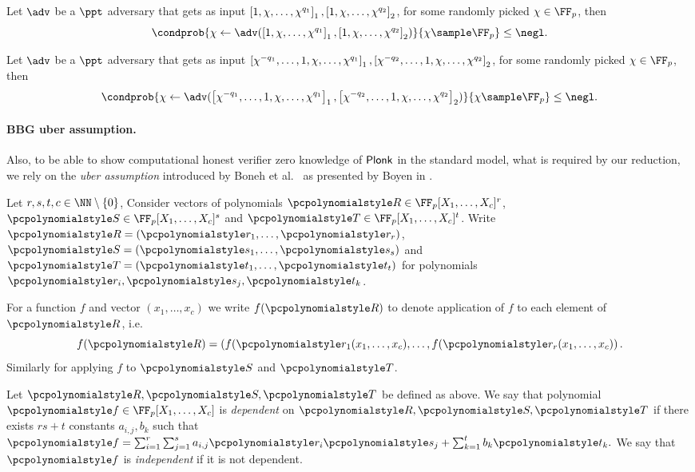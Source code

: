 \documentclass[runningheads,10pt]{llncs}
\begin{document}
\begin{definition}
	Let $\adv$ be a $\ppt$ adversary that gets as input
  $\left[1, \chi, \ldots, \chi^{q_1}\right]_{1}, \left[1, \chi, \ldots, \chi^{q_2}\right]_{2}$, for
  some randomly picked $\chi \in \FF_p$, then
	\[
		\condprob{\chi \gets \adv(\gone{1, \chi, \ldots, \chi^{q_1}}, \gtwo{1, \chi,
        \ldots, \chi^{q_2} })}{\chi \sample \FF_p} \leq \negl.
	\]
\end{definition}

\begin{definition}
  Let $\adv$ be a $\ppt$ adversary that gets as input
  $\left[\chi^{-q_1}, \ldots, 1, \chi, \ldots, \chi^{q_1}\right]_{1}, \left[\chi^{-q_2},
    \ldots, 1, \chi, \ldots, \chi^{q_2}\right]_{2}$, for some randomly picked
  $\chi \in \FF_p$, then
	\[
    \condprob{\chi \gets \adv(\gone{\chi^{-q_1}, \ldots, 1, \chi, \ldots,
        \chi^{q_1}}, \gtwo{\chi^{-q_2}, \ldots, 1, \chi, \ldots, \chi^{q_2}
      })}{\chi \sample \FF_p} \leq \negl.
	\]
\end{definition}

\paragraph{BBG uber assumption.}
Also, to be able to show computational honest verifier zero knowledge of
$\textnormal{\textsf{Plonk}}$ in the standard model, what is required by our reduction, we rely on the
\emph{uber assumption} introduced by Boneh et
al.~\cite{EC:BonBoyGoh05} as presented by Boyen in \cite{PAIRING:Boyen08}.

Let $r, s, t, c \in \NN \setminus \smallset{0}$, Consider vectors of polynomials
$\pR \in \FF_p[X_1, \ldots, X_c]^r$, $\pS \in \FF_p[X_1, \ldots, X_c]^s$ and
$\pT \in \FF_p[X_1, \ldots, X_c]^t$. Write $\pR = \left( \p{r}_1, \ldots,
  \p{r}_r \right)$, $\pS = \left( \p{s}_1, \ldots, \p{s}_s \right)$ and $\pT =
\left( \p{t}_1, \ldots, \p{t}_t \right)$ for polynomials $\p{r}_i, \p{s}_j,
\p{t}_k$.

For a function $f$ and vector $(x_1, \ldots, x_c)$ we write $f(\pR)$ to
denote application of $f$ to each element of $\pR$, i.e.
\[
	f(\pR) = \left( f(\p{r}_1 (x_1, \ldots, x_c), \ldots, f(\p{r}_r
	(x_1, \ldots, x_c) \right).
\]
Similarly for applying $f$ to $\pS$ and $\pT$.

\begin{definition}[Independence of $\pR, \pS, \pT$]
	\label{def:independence}
	Let $\pR, \pS, \pT$ be defined as above. We say that polynomial $\p{f} \in
  \FF_p[X_1, \ldots, X_c]$ is \emph{dependent} on $\pR, \pS, \pT$ if there
  exists $rs + t$ constants $a_{i, j}, b_k$ such that $ \p{f} = \sum_{i = 1}^{r}
  \sum_{j = 1}^{s} a_{i, j} \p{r}_i \p{s}_j + \sum_{k = 1}^{t} b_k \p{t}_k. $ We
  say that $\p{f}$ is \emph{independent} if it is not dependent.
\end{definition}
\end{document}
